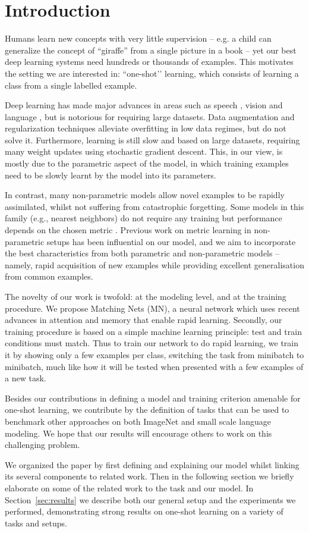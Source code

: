 \section{Introduction}
\label{sec:intro}

Humans learn new concepts with very little supervision -- e.g. a child can generalize the concept of ``giraffe'' from a single picture in a book -- yet our best deep learning systems need hundreds or thousands of examples. This motivates the setting we are interested in: ``one-shot’’ learning, which consists of learning a class from a single labelled example.

Deep learning has made major advances in areas such as speech \cite{hinton2012deep}, vision \cite{krizhevsky2012imagenet} and language \cite{mikolov2010recurrent}, but is notorious for requiring large datasets. Data augmentation and regularization techniques alleviate overfitting in low data regimes, but do not solve it. Furthermore, learning is still slow and based on large datasets, requiring many weight updates using stochastic gradient descent. This, in our view, is mostly due to the parametric aspect of the model, in which training examples need to be slowly learnt by the model into its parameters.

In contrast, many non-parametric models allow novel examples to be rapidly assimilated, whilst not suffering from catastrophic forgetting. Some models in this family (e.g., nearest neighbors) do not require any training but performance depends on the chosen metric \cite{lwl}. Previous work on metric learning in non-parametric setups \cite{nca} has been influential on our model, and we aim to incorporate the best characteristics from both parametric and non-parametric models -- namely, rapid acquisition of new examples while providing excellent generalisation from common examples.

The novelty of our work is twofold: at the modeling level, and at the training procedure. We propose Matching Nets (MN), a neural network which uses recent advances in attention and memory that enable rapid learning. Secondly, our training procedure is based on a simple machine learning principle: test and train conditions must match. Thus to train our network to do rapid learning, we train it by showing only a few examples per class, switching the task from minibatch to minibatch, much like how it will be tested when presented with a few examples of a new task. 

Besides our contributions in defining a model and training criterion amenable for one-shot learning, we contribute by the definition of tasks that can be used to benchmark other approaches on both ImageNet and small scale language modeling. We hope that our results will encourage others to work on this challenging problem.

We organized the paper by first defining and explaining our model whilst linking its several components to related work. Then in the following section we briefly elaborate on some of the related work to the task and our model. In Section~\ref{sec:results} we describe both our general setup and the experiments we performed, demonstrating strong results on one-shot learning on a variety of tasks and setups. 
